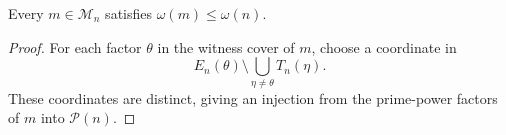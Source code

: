 \begin{corollary}\label{cor:support-bound}
Every $m\in\mathcal M_n$ satisfies $\omega(m)\leq\omega(n)$.
\end{corollary}

\begin{proof}
For each factor $\theta$ in the witness cover of $m$, choose a coordinate in
\[
 E_n(\theta)\setminus
 \bigcup_{\eta\ne\theta}T_n(\eta).
\]
These coordinates are distinct, giving an injection from the prime-power
factors of $m$ into $\mathcal P(n)$.
\end{proof}
